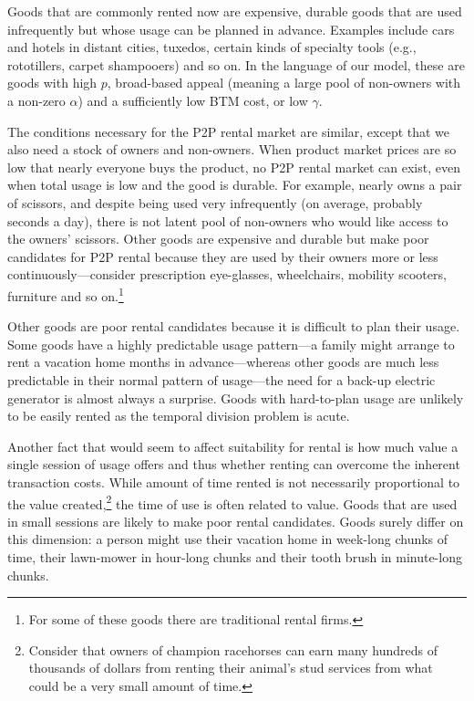 \documentclass[11pt]{article}
\begin{document}
Goods that are commonly rented now are expensive, durable goods that are used infrequently but whose usage can be planned in advance.
Examples include cars and hotels in distant cities, tuxedos, certain kinds of specialty tools (e.g., rototillers, carpet shampooers) and so on.
In the language of our model, these are goods with high $p$, broad-based appeal (meaning a large pool of non-owners with a non-zero $\alpha$) and a sufficiently low BTM cost, or low $\gamma$.

The conditions necessary for the P2P rental market are similar, except that we also need a stock of owners and non-owners. 
When product market prices are so low that nearly everyone buys the product, no P2P rental market can exist, even when total usage is low and the good is durable.
For example, nearly owns a pair of scissors, and despite being used very infrequently (on average, probably seconds a day), there is not latent pool of non-owners who would like access to the owners' scissors.  
Other goods are expensive and durable but make poor candidates for P2P rental because they are used by their owners more or less continuously---consider prescription eye-glasses, wheelchairs, mobility scooters, furniture and so on.\footnote{
  For some of these goods there are traditional rental firms. 
} 

Other goods are poor rental candidates because it is difficult to plan their usage.
Some goods have a highly predictable usage pattern---a family might arrange to rent a vacation home months in advance---whereas other goods are much less predictable in their normal pattern of usage---the need for a back-up electric generator is almost always a surprise.  
Goods with hard-to-plan usage are unlikely to be easily rented as the temporal division problem is acute.

Another fact that would seem to affect suitability for rental is how much value a single session of usage offers and thus whether renting can overcome the inherent transaction costs.
While amount of time rented is not necessarily proportional to the value created,\footnote{Consider that owners of champion racehorses can earn many hundreds of thousands of dollars from renting their animal's stud services from what could be a very small amount of time.}  
the time of use is often related to value.
Goods that are used in small sessions are likely to make poor rental candidates.
Goods surely differ on this dimension: 
a person might use their vacation home in week-long chunks of time, their lawn-mower in hour-long chunks and their tooth brush in minute-long chunks. 
\end{document}
